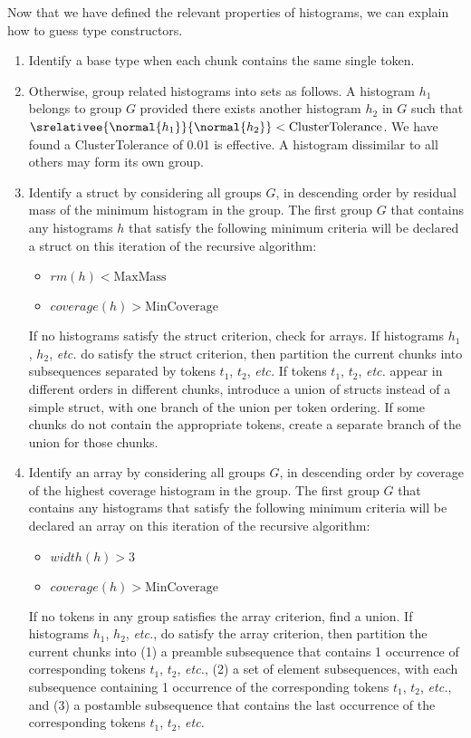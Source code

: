 Now that we have defined the relevant properties of histograms,
we can explain how to guess type constructors.

\begin {enumerate}
\item Identify a base type when each chunk contains the same single token.

\item Otherwise, group related histograms into sets as follows.  
A histogram $h_1$ belongs to
group $G$ provided there exists another histogram $h_2$ in $G$
such that $\srelativee{\normal{h_1}}{\normal{h_2}} < 
\mathrm{ClusterTolerance}$.  We have found a ClusterTolerance
of 0.01 is effective.  A histogram dissimilar to all others may form 
its own group.

\item Identify a struct by 
considering all groups $G$, in descending order by residual mass
of the minimum histogram in the group.
The first group $G$ that contains any histograms $h$ that satisfy the
 following minimum criteria will be declared a struct on this 
iteration of the recursive algorithm:
\begin {itemize}
\item $\mathit{rm}(h) < \mathrm{MaxMass}$
\item $\mathit{coverage}(h) > \mathrm{MinCoverage}$
\end{itemize}
If no histograms satisfy the struct criterion, check for arrays.
If histograms $h_1$, $h_2$, {\em etc.} do satisfy the struct criterion, 
then partition the current chunks into subsequences separated
by tokens $t_1$, $t_2$, {\em etc.}  If tokens $t_1$, $t_2$, {\em etc.}
appear in different orders in different chunks, introduce a union of structs
instead of a simple struct, with one branch of the union per token 
ordering.  If some chunks do not contain the appropriate tokens, 
create a separate branch of the union for those chunks.

\item Identify an array by considering all groups $G$, in descending 
order by coverage of the highest coverage histogram in the group.
The first group $G$ that contains any histograms that satisfy the
 following minimum criteria will be declared an array on this 
iteration of the recursive algorithm:
\begin {itemize}
\item $\mathit{width}(h) > 3$
\item $\mathit{coverage}(h) > \mathrm{MinCoverage}$
\end{itemize}
If no tokens in any group satisfies the array criterion, find a union.
If histograms $h_1$, $h_2$, {\em etc.}, do satisfy the array criterion, 
then partition the current chunks into (1) a preamble subsequence 
that contains 1 occurrence of corresponding tokens $t_1$, $t_2$, {\em etc.},
(2) a set of element subsequences, with each subsequence containing
1 occurrence of the corresponding tokens  $t_1$, $t_2$, {\em etc.}, and
(3) a postamble subsequence that contains the last occurrence of 
the corresponding tokens $t_1$, $t_2$, {\em etc.}


\end{enumerate}
